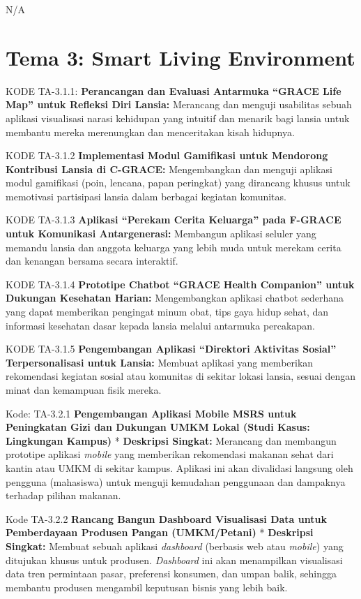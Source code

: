 \documentclass[
  letterpaper,
  DIV=11,
  numbers=noendperiod]{scrreprt}
\begin{document}
N/A

\section{Tema 3: Smart Living
Environment}\label{tema-3-smart-living-environment-2}

KODE TA-3.1.1: \textbf{Perancangan dan Evaluasi Antarmuka ``GRACE Life
Map'' untuk Refleksi Diri Lansia:} Merancang dan menguji usabilitas
sebuah aplikasi visualisasi narasi kehidupan yang intuitif dan menarik
bagi lansia untuk membantu mereka merenungkan dan menceritakan kisah
hidupnya.

KODE TA-3.1.2 \textbf{Implementasi Modul Gamifikasi untuk Mendorong
Kontribusi Lansia di C-GRACE:} Mengembangkan dan menguji aplikasi modul
gamifikasi (poin, lencana, papan peringkat) yang dirancang khusus untuk
memotivasi partisipasi lansia dalam berbagai kegiatan komunitas.

KODE TA-3.1.3 \textbf{Aplikasi ``Perekam Cerita Keluarga'' pada F-GRACE
untuk Komunikasi Antargenerasi:} Membangun aplikasi seluler yang memandu
lansia dan anggota keluarga yang lebih muda untuk merekam cerita dan
kenangan bersama secara interaktif.

KODE TA-3.1.4 \textbf{Prototipe Chatbot ``GRACE Health Companion'' untuk
Dukungan Kesehatan Harian:} Mengembangkan aplikasi chatbot sederhana
yang dapat memberikan pengingat minum obat, tips gaya hidup sehat, dan
informasi kesehatan dasar kepada lansia melalui antarmuka percakapan.

KODE TA-3.1.5 \textbf{Pengembangan Aplikasi ``Direktori Aktivitas
Sosial'' Terpersonalisasi untuk Lansia:} Membuat aplikasi yang
memberikan rekomendasi kegiatan sosial atau komunitas di sekitar lokasi
lansia, sesuai dengan minat dan kemampuan fisik mereka.

Kode: TA-3.2.1 \textbf{Pengembangan Aplikasi Mobile MSRS untuk
Peningkatan Gizi dan Dukungan UMKM Lokal (Studi Kasus: Lingkungan
Kampus)} * \textbf{Deskripsi Singkat:} Merancang dan membangun prototipe
aplikasi \emph{mobile} yang memberikan rekomendasi makanan sehat dari
kantin atau UMKM di sekitar kampus. Aplikasi ini akan divalidasi
langsung oleh pengguna (mahasiswa) untuk menguji kemudahan penggunaan
dan dampaknya terhadap pilihan makanan.

Kode TA-3.2.2 \textbf{Rancang Bangun Dashboard Visualisasi Data untuk
Pemberdayaan Produsen Pangan (UMKM/Petani)} * \textbf{Deskripsi
Singkat:} Membuat sebuah aplikasi \emph{dashboard} (berbasis web atau
\emph{mobile}) yang ditujukan khusus untuk produsen. \emph{Dashboard}
ini akan menampilkan visualisasi data tren permintaan pasar, preferensi
konsumen, dan umpan balik, sehingga membantu produsen mengambil
keputusan bisnis yang lebih baik.
\end{document}
